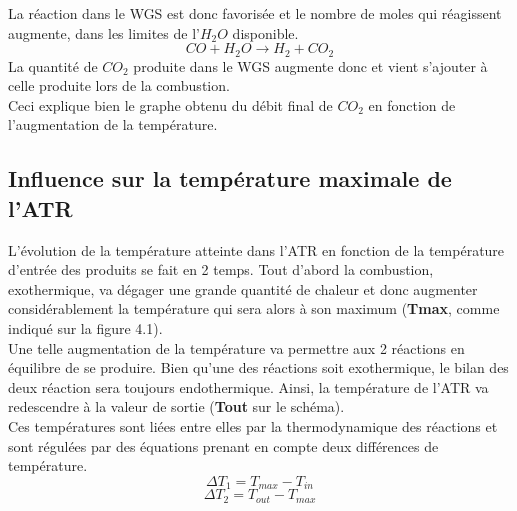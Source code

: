 \documentclass[12pt]{report}
\begin{document}
 La réaction dans le WGS est donc favorisée et le nombre de moles qui réagissent augmente, dans les limites de l'$H_2O$ disponible.
 \begin{equation}
CO + H_2O \rightarrow H_2 + CO_2
\end{equation}
La quantité de $CO_2$ produite dans le WGS augmente donc et vient s'ajouter à celle produite lors de la combustion.\\

Ceci explique bien le graphe obtenu du débit final de $CO_2$ en fonction de l'augmentation de la température.


\textcolor{carmine}{\chapter{Influence sur la température maximale de l'ATR}}

L'évolution de la température atteinte dans l'ATR en fonction de la température d'entrée des produits se fait en 2 temps. Tout d'abord la combustion, exothermique, va dégager une grande quantité de chaleur et donc augmenter considérablement la température qui sera alors à son maximum (\textbf{Tmax}, comme indiqué sur la figure 4.1).\\
 Une telle augmentation de la température va permettre aux 2 réactions en équilibre de se produire. Bien qu'une des réactions soit exothermique, le bilan des deux réaction sera toujours endothermique. Ainsi, la température de l'ATR va redescendre à la valeur de sortie (\textbf{Tout} sur le schéma).\\
 

 
Ces températures sont liées entre elles par la thermodynamique des réactions et sont régulées par des équations prenant en compte deux différences de température. \\

$$\Delta T_1 = T_{max} - T_{in}$$
$$\Delta T_2 = T_{out} - T_{max}$$
\end{document}

